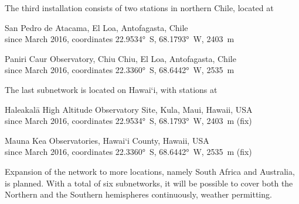         The third installation consists of two stations in northern Chile, located at
        \begin{description}[leftmargin = 25mm]
            \item[SP]       San Pedro de Atacama, El Loa, Antofagasta, Chile\\
                            since March 2016, coordinates \ang{22.9534}~S, \ang{68.1793}~W, \SI{2403}{\metre}
            \item[PC]       Paniri Caur Observatory, Chiu Chiu, El Loa, Antofagasta, Chile\\
                            since March 2016, coordinates \ang{22.3360}~S, \ang{68.6442}~W, \SI{2535}{\metre}
        \end{description}

        The last subnetwork is located on Hawai`i, with stations at
        \begin{description}[leftmargin = 25mm]
            \item[HK]       Haleakalā High Altitude Observatory Site, Kula, Maui, Hawaii, USA\\
                            since March 2016, coordinates \ang{22.9534}~S, \ang{68.1793}~W, \SI{2403}{\metre} (fix)
            \item[MK]       Mauna Kea Observatories, Hawai`i County, Hawaii, USA\\
                            since March 2016, coordinates \ang{22.3360}~S, \ang{68.6442}~W, \SI{2535}{\metre} (fix)
        \end{description}


        Expansion of the network to more locations, namely South Africa and Australia, is planned.
        With a total of six subnetworks, it will be possible to cover both the Northern and
        the Southern hemispheres continuously, weather permitting.
